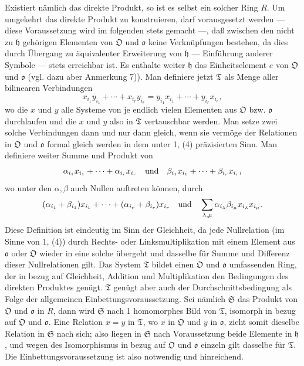 Existiert nämlich das direkte Produkt, so ist es selbst ein solcher Ring $R$. Um umgekehrt das direkte Produkt zu konstruieren, darf vorausgesetzt werden --- diese Voraussetzung wird im folgenden stets gemacht ---, daß zwischen den nicht zu $\mathfrak h$ gehörigen Elementen von $\mathfrak O$ und $\mathfrak o$ keine Verknüpfungen bestehen, da dies durch Übergang zu äquivalenter Erweiterung von $\mathfrak h$ --- Einführung anderer Symbole --- stets erreichbar ist. Es enthalte weiter $\mathfrak h$ das Einheitselement $e$ von $\mathfrak O$ und $\mathfrak o$ (vgl. dazu aber Anmerkung 7)). Man definiere jetzt $\mathfrak T$ als Menge aller bilinearen Verbindungen
\[
x_{i_1}y_{i_1}+\cdots+x_{i_r}y_{i_r}
 =y_{i_1}x_{i_1}+\cdots+y_{i_r}x_{i_r},
\]
wo die $x$ und $y$ alle Systeme von je endlich vielen Elementen aus $\mathfrak O$ bzw. $\mathfrak o$ durchlaufen und die $x$ und $y$ also in $\mathfrak T$ vertauschbar werden. Man setze zwei solche Verbindungen dann und nur dann gleich, wenn sie vermöge der Relationen in $\mathfrak O$ und $\mathfrak o$ formal gleich werden in dem unter 1, (4) präzisierten Sinn. Man definiere weiter Summe und Produkt von
\[
\alpha_{i_1}x_{i_1}+\cdots+\alpha_{i_r}x_{i_r}
\quad\hbox{und}\quad
\beta_{i_1}x_{i_1}+\cdots+\beta_{i_r}x_{i_r},
\]
wo unter den $\alpha,\beta$ auch Nullen auftreten können, durch
\[
(\alpha_{i_1}+\beta_{i_1})x_{i_1}+\cdots+(\alpha_{i_r}+\beta_{i_r})x_{i_r}
\quad\hbox{und}\quad
\sum_{\lambda,\mu}\alpha_{i_\lambda}\beta_{i_\mu}x_{i_\lambda}x_{i_\mu}.
\]
Diese Definition ist eindeutig im Sinn der Gleichheit, da jede Nullrelation (im Sinne von 1, (4)) durch Rechts- oder Linksmultiplikation mit einem Element aus $\mathfrak o$ oder $\mathfrak O$ wieder in eine solche übergeht und dasselbe für Summe und Differenz dieser Nullrelationen gilt. Das System $\mathfrak T$ bildet einen $\mathfrak O$ und $\mathfrak o$ umfassenden Ring, der in bezug auf Gleichheit, Addition und Multiplikation den Bedingungen des direkten Produktes genügt. $\mathfrak T$ genügt aber auch der Durchschnittsbedingung als Folge der allgemeinen Einbettungsvoraussetzung. Sei nämlich $\mathfrak S$ das Produkt von $\mathfrak O$ und $\mathfrak o$ in $R$, dann wird $\mathfrak S$ nach 1 homomorphes Bild von $\mathfrak T$, isomorph in bezug auf $\mathfrak O$ und $\mathfrak o$. Eine Relation $x=y$ in $\mathfrak T$, wo $x$ in $\mathfrak O$ und $y$ in $\mathfrak o$, zieht somit dieselbe Relation in $\mathfrak S$ nach sich; also liegen in $\mathfrak S$ nach Voraussetzung beide Elemente in $\mathfrak h$, und wegen des Isomorphismus in bezug auf $\mathfrak O$ und $\mathfrak o$ einzeln gilt dasselbe für $\mathfrak T$. Die Einbettungsvoraussetzung ist also notwendig und hinreichend.


